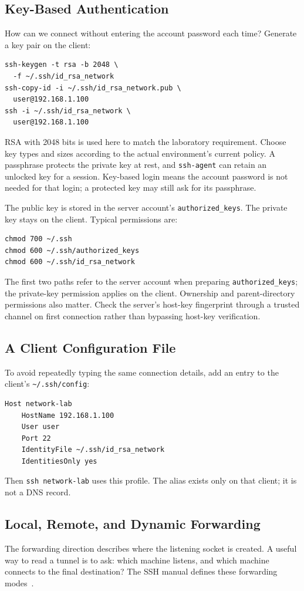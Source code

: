 \documentclass[journal]{IEEEtran}
\begin{document}
\subsection{Key-Based Authentication}
How can we connect without entering the account password each time? Generate a key pair on the client:
\begin{lstlisting}
ssh-keygen -t rsa -b 2048 \
  -f ~/.ssh/id_rsa_network
ssh-copy-id -i ~/.ssh/id_rsa_network.pub \
  user@192.168.1.100
ssh -i ~/.ssh/id_rsa_network \
  user@192.168.1.100
\end{lstlisting}
RSA with 2048 bits is used here to match the laboratory requirement. Choose key types and sizes according to the actual environment's current policy. A passphrase protects the private key at rest, and \texttt{ssh-agent} can retain an unlocked key for a session. Key-based login means the account password is not needed for that login; a protected key may still ask for its passphrase.

The public key is stored in the server account's \texttt{authorized\_keys}. The private key stays on the client. Typical permissions are:
\begin{lstlisting}
chmod 700 ~/.ssh
chmod 600 ~/.ssh/authorized_keys
chmod 600 ~/.ssh/id_rsa_network
\end{lstlisting}
The first two paths refer to the server account when preparing \texttt{authorized\_keys}; the private-key permission applies on the client. Ownership and parent-directory permissions also matter. Check the server's host-key fingerprint through a trusted channel on first connection rather than bypassing host-key verification.

\subsection{A Client Configuration File}
To avoid repeatedly typing the same connection details, add an entry to the client's \texttt{\textasciitilde/.ssh/config}:
\begin{lstlisting}
Host network-lab
    HostName 192.168.1.100
    User user
    Port 22
    IdentityFile ~/.ssh/id_rsa_network
    IdentitiesOnly yes
\end{lstlisting}
Then \texttt{ssh network-lab} uses this profile. The alias exists only on that client; it is not a DNS record.

\subsection{Local, Remote, and Dynamic Forwarding}
The forwarding direction describes where the listening socket is created. A useful way to read a tunnel is to ask: which machine listens, and which machine connects to the final destination? The SSH manual defines these forwarding modes~\cite{ssh}.
\end{document}
